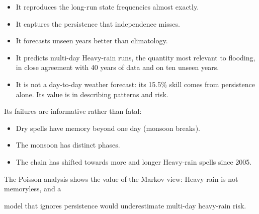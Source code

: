 \documentclass[11pt,a4paper]{article}
\providecommand{\tightlist}{\setlength{\itemsep}{0pt}\setlength{\parskip}{0pt}}
\begin{document}
\begin{itemize}

\tightlist

\item

  It reproduces the long-run state frequencies almost exactly.

\item

  It captures the persistence that independence misses.

\item

  It forecasts unseen years better than climatology.

\item

  It predicts multi-day Heavy-rain runs, the quantity most relevant to flooding, in close agreement with 40 years of data and on ten unseen years.

\item

  It is not a day-to-day weather forecast: its 15.5\% skill comes from persistence alone. Its value is in describing patterns and risk.

\end{itemize}



Its failures are informative rather than fatal:



\begin{itemize}

\tightlist

\item

  Dry spells have memory beyond one day (monsoon breaks).

\item

  The monsoon has distinct phases.

\item

  The chain has shifted towards more and longer Heavy-rain spells since 2005.

\end{itemize}



The Poisson analysis shows the value of the Markov view: Heavy rain is not memoryless, and a

model that ignores persistence would underestimate multi-day heavy-rain risk.
\end{document}
